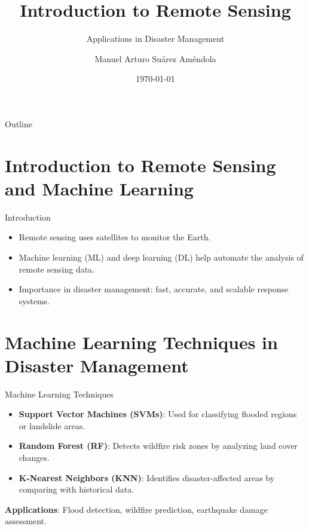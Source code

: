 \documentclass[10pt]{beamer}
\title{Introduction to Remote Sensing}
\subtitle{Applications in Disaster Management}
\author{Manuel Arturo Suárez Améndola}
\date{\today}
\begin{document}
\begin{frame}
    \titlepage
\end{frame}

\begin{frame}{Outline}
    \tableofcontents
\end{frame}

\section{Introduction to Remote Sensing and Machine Learning}
\begin{frame}{Introduction}
    \begin{itemize}
        \item Remote sensing uses satellites to monitor the Earth.
        \item Machine learning (ML) and deep learning (DL) help automate the analysis of remote sensing data.
        \item Importance in disaster management: fast, accurate, and scalable response systems.
    \end{itemize}
\end{frame}

\section{Machine Learning Techniques in Disaster Management}
\begin{frame}{Machine Learning Techniques}
    \begin{itemize}
        \item \textbf{Support Vector Machines (SVMs)}: Used for classifying flooded regions or landslide areas.
        \item \textbf{Random Forest (RF)}: Detects wildfire risk zones by analyzing land cover changes.
        \item \textbf{K-Nearest Neighbors (KNN)}: Identifies disaster-affected areas by comparing with historical data.
    \end{itemize}
    \vspace{5mm}
    \textbf{Applications}: Flood detection, wildfire prediction, earthquake damage assessment.
\end{frame}

\end{document}
